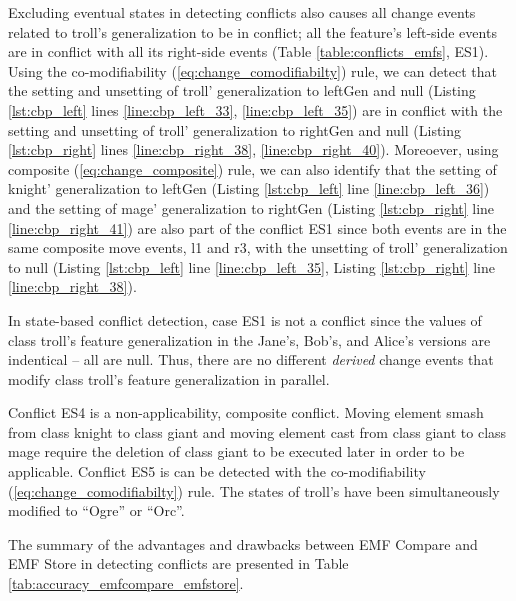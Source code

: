 Excluding eventual states in detecting conflicts also causes all change events related to \textsf{troll}'s \textsf{generalization} to be in conflict; all the feature's left-side events are in conflict with all its right-side events (Table \ref{table:conflicts_emfs}, ES1). Using the co-modifiability  (\ref{eq:change_comodifiabilty}) rule, we can detect that the setting and unsetting of \textsf{troll}' \textsf{generalization} to \textsf{leftGen} and \textsf{null} (Listing \ref{lst:cbp_left} lines \ref{line:cbp_left_33}, \ref{line:cbp_left_35}) are in conflict with the setting and unsetting of \textsf{troll}' \textsf{generalization} to \textsf{rightGen} and \textsf{null} (Listing \ref{lst:cbp_right} lines \ref{line:cbp_right_38}, \ref{line:cbp_right_40}). Moreoever, using composite (\ref{eq:change_composite}) rule, we can also identify that the setting of \textsf{knight}' \textsf{generalization} to \textsf{leftGen} (Listing \ref{lst:cbp_left} line \ref{line:cbp_left_36}) and the setting of \textsf{mage}' \textsf{generalization} to \textsf{rightGen} (Listing \ref{lst:cbp_right} line \ref{line:cbp_right_41}) are also part of the conflict ES1 since both events are in the same composite move events, \textsf{l1} and \textsf{r3}, with the unsetting of \textsf{troll}' \textsf{generalization} to  \textsf{null} (Listing \ref{lst:cbp_left} line \ref{line:cbp_left_35}, Listing \ref{lst:cbp_right} line \ref{line:cbp_right_38}).

In state-based conflict detection, case ES1 is not a conflict since the values of class \textsf{troll}'s feature \textsf{generalization} in the Jane's, Bob's, and Alice's versions are indentical -- all are null. Thus, there are no different \textit{derived} change events that modify class \textsf{troll}'s feature \textsf{generalization} in parallel. 

Conflict ES4 is a non-applicability, composite conflict. Moving element \textsf{smash} from class \textsf{knight} to class \textsf{giant} and moving element \textsf{cast} from class \textsf{giant} to class \textsf{mage} require the deletion of class \textsf{giant} to be executed later in order to be applicable. Conflict ES5 is can be detected with the co-modifiability  (\ref{eq:change_comodifiabilty}) rule. The states of \textsf{troll}'s  have been simultaneously modified to ``Ogre'' or ``Orc''.

The summary of the advantages and drawbacks between EMF Compare and EMF Store in detecting conflicts are presented in Table \ref{tab:accuracy_emfcompare_emfstore}.

